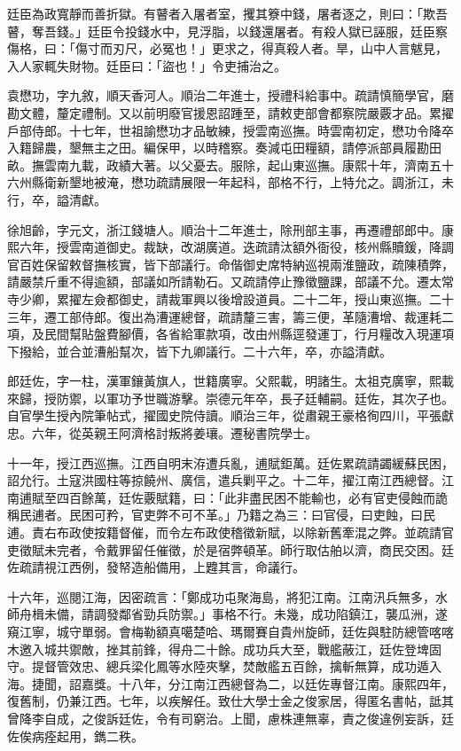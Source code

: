 \begin{pinyinscope}
廷臣為政寬靜而善折獄。有瞽者入屠者室，攫其簝中錢，屠者逐之，則曰：「欺吾瞽，奪吾錢。」廷臣令投錢水中，見浮脂，以錢還屠者。有殺人獄已誣服，廷臣察傷格，曰：「傷寸而刃尺，必冤也！」更求之，得真殺人者。旱，山中人言魃見，入人家輒失財物。廷臣曰：「盜也！」令吏捕治之。

袁懋功，字九敘，順天香河人。順治二年進士，授禮科給事中。疏請慎簡學官，磨勘文體，釐定禮制。又以前明廢官援恩詔踵至，請敕吏部會都察院嚴覈才品。累擢戶部侍郎。十七年，世祖諭懋功才品敏練，授雲南巡撫。時雲南初定，懋功令降卒入籍歸農，墾無主之田。編保甲，以時稽察。奏減屯田糧額，請停派部員履勘田畝。撫雲南九載，政績大著。以父憂去。服除，起山東巡撫。康熙十年，濟南五十六州縣衛新墾地被淹，懋功疏請展限一年起科，部格不行，上特允之。調浙江，未行，卒，謚清獻。

徐旭齡，字元文，浙江錢塘人。順治十二年進士，除刑部主事，再遷禮部郎中。康熙六年，授雲南道御史。裁缺，改湖廣道。迭疏請汰額外衙役，核州縣贖鍰，降調官百姓保留敕督撫核實，皆下部議行。命偕御史席特納巡視兩淮鹽政，疏陳積弊，請嚴禁斤重不得逾額，部議如所請勒石。又疏請停止豫徵鹽課，部議不允。遷太常寺少卿，累擢左僉都御史，請裁軍興以後增設道員。二十二年，授山東巡撫。二十三年，遷工部侍郎。復出為漕運總督，疏請釐三害，籌三便，革隨漕增、裁運耗二項，及民間幫貼盤費腳價，各省給軍款項，改由州縣逕發運丁，行月糧改入現運項下撥給，並合並漕船幫次，皆下九卿議行。二十六年，卒，亦謚清獻。

郎廷佐，字一柱，漢軍鑲黃旗人，世籍廣寧。父熙載，明諸生。太祖克廣寧，熙載來歸，授防禦，以軍功予世職游擊。崇德元年卒，長子廷輔嗣。廷佐，其次子也。自官學生授內院筆帖式，擢國史院侍讀。順治三年，從肅親王豪格徇四川，平張獻忠。六年，從英親王阿濟格討叛將姜瓖。遷秘書院學士。

十一年，授江西巡撫。江西自明末洊遭兵亂，逋賦鉅萬。廷佐累疏請蠲緩蘇民困，詔允行。土寇洪國柱等掠饒州、廣信，遣兵剿平之。十二年，擢江南江西總督。江南逋賦至四百餘萬，廷佐覈賦籍，曰：「此非盡民困不能輸也，必有官吏侵蝕而詭稱民逋者。民困可矜，官吏弊不可不革。」乃籍之為三：曰官侵，曰吏蝕，曰民逋。責右布政使按籍督催，而令左布政使稽徵新賦，以除新舊牽混之弊。並疏請官吏徵賦未完者，令戴罪留任催徵，於是宿弊頓革。師行取估舶以濟，商民交困。廷佐疏請視江西例，發帑造船備用，上韙其言，命議行。

十六年，巡閱江海，因密疏言：「鄭成功屯聚海島，將犯江南。江南汛兵無多，水師舟楫未備，請調發鄰省勁兵防禦。」事格不行。未幾，成功陷鎮江，襲瓜洲，遂窺江寧，城守單弱。會梅勒額真噶楚哈、瑪爾賽自貴州旋師，廷佐與駐防總管喀喀木邀入城共禦敵，挫其前鋒，得舟二十餘。成功兵大至，戰艦蔽江，廷佐登埤固守。提督管效忠、總兵梁化鳳等水陸夾擊，焚敵艦五百餘，擒斬無算，成功遁入海。捷聞，詔嘉獎。十八年，分江南江西總督為二，以廷佐專督江南。康熙四年，復舊制，仍兼江西。七年，以疾解任。致仕大學士金之俊家居，得匿名書帖，詆其曾降李自成，之俊訴廷佐，令有司窮治。上聞，慮株連無辜，責之俊違例妄訴，廷佐俟病痊起用，鐫二秩。


\end{pinyinscope}
